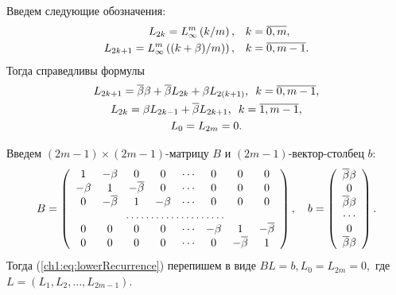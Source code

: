 {Введем следующие обозначения:
\begin{align*}
  L_{2k} = L_{\infty}^m\left({k/m}\right), & \quad k = \overline{0, m},\\
  L_{2k+1} = L_{\infty}^m\left({(k+\beta)/m)}\right), & \quad k = \overline{0, m-1}.
\end{align*}
Тогда справедливы формулы
\begin{equation}
  \label{ch1:eq:lowerRecurrence}
  \begin{gathered}
    L_{2k+1} = {\overline{\beta}}\beta + {\overline{\beta}} L_{2k} + \beta L_{2(k+1)}, \enskip k = \overline{0, m-1},\\
    L_{2k} = \beta L_{2k-1} + {\overline{\beta}} L_{2k+1}, \enskip k = \overline{1, m-1},\\
    L_0 = L_{2m} = 0.
  \end{gathered}
\end{equation}

Введем $(2m-1)\times(2m-1)$-матрицу $B$ и $(2m-1)$-вектор-столбец $b$:
\begin{equation*}
  B =
  \left(
    \begin{array}{cccccccc}
      1      & -\Co  & 0       & 0      & \cdots & 0      & 0       & 0       \\
      -\Co & 1       & -\DCo & 0      & \cdots & 0      & 0       & 0       \\
      0      & -\DCo & 1       & -\Co & \cdots & 0      & 0       & 0       \\
      \hdotsfor{8}                                                              \\
      0      & 0       & 0       & 0      & \cdots & -\Co & 1       & -\DCo \\
      0      & 0       & 0       & 0      & \cdots & 0      & -\DCo & 1 
    \end{array}
  \right),\quad
  b = \left(
    \begin{array}{c}
      \DCo\Co \\
      0           \\
      \DCo\Co \\
      \cdots      \\
      0           \\
      \DCo\Co
    \end{array}
  \right).
\end{equation*}
Тогда (\ref{ch1:eq:lowerRecurrence}) перепишем в виде $ BL = b, L_0 = L_{2m} = 0, $ где $L = (L_1, L_2, \ldots, L_{2m-1})$.

}
